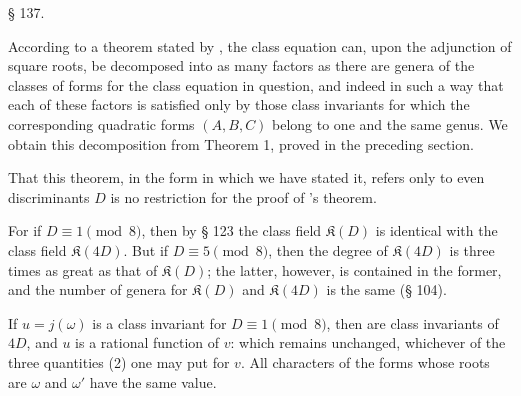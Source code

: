 

\begin{center}
§ 137.\quad {}
\end{center}

According to a theorem stated by , the class equation can, upon the adjunction of square roots, be decomposed into as many factors as there are genera of the classes of forms for the class equation in question, and indeed in such a way that each of these factors is satisfied only by those class invariants for which the corresponding quadratic forms $(A,B,C)$ belong to one and the same genus. We obtain this decomposition from Theorem 1, proved in the preceding section. %

That this theorem, in the form in which we have stated it, refers only to even discriminants $D$ is no restriction for the proof of 's theorem.

For if $D\equiv 1\pmod 8$, then by § 123 the class field $\mathfrak{K}(D)$ is identical with the class field $\mathfrak{K}(4D)$. But if $D\equiv 5\pmod 8$, then the degree of $\mathfrak{K}(4D)$ is three times as great as that of $\mathfrak{K}(D)$; the latter, however, is contained in the former, and the number of genera for $\mathfrak{K}(D)$ and $\mathfrak{K}(4D)$ is the same (§ 104).

If $u=j(\omega)$ is a class invariant for $D\equiv 1\pmod 8$, then
are class invariants of $4D$, and $u$ is a rational function of $v$:
which remains unchanged, whichever of the three quantities (2) one may put for $v$. %
All characters of the forms whose roots are $\omega$ and $\omega'$ have the same value.
